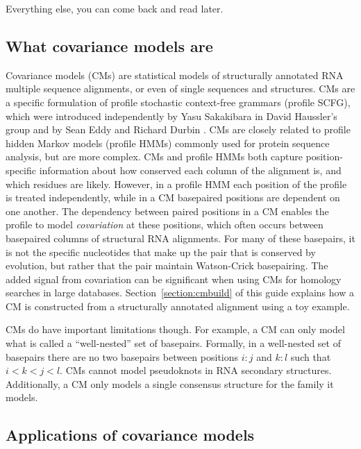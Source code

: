 Everything else, you can come back and read later.

\subsection{What covariance models are}

Covariance models (CMs) are statistical models of structurally
annotated RNA multiple sequence alignments, or even of single
sequences and structures. CMs are a specific formulation of profile
stochastic context-free grammars (profile SCFG), which were introduced
independently by Yasu Sakakibara in David Haussler's
group \citep{Sakakibara94c} and by Sean Eddy and Richard
Durbin \citep{Eddy94}. CMs are closely related to profile hidden Markov
models (profile HMMs) commonly used for protein sequence analysis, but
are more complex. CMs and profile HMMs both capture position-specific
information about how conserved each column of the alignment is, and
which residues are likely. However, in a profile HMM each position of
the profile is treated independently, while in a CM basepaired
positions are dependent on one another.  The dependency between paired
positions in a CM enables the profile to model \emph{covariation} at
these positions, which often occurs between basepaired columns of
structural RNA alignments. For many of these basepairs, it is not the
specific nucleotides that make up the pair that is conserved by
evolution, but rather that the pair maintain Watson-Crick
basepairing. The added signal from covariation can be significant when
using CMs for homology searches in large
databases. Section~\ref{section:cmbuild} of this guide explains how a
CM is constructed from a structurally annotated alignment using a toy
example. 

CMs do have important limitations though. For example, a CM can only
model what is called a ``well-nested'' set of basepairs. Formally, in
a well-nested set of basepairs there are no two basepairs between
positions $i:j$ and $k:l$ such that $i<k<j<l$. CMs cannot model
pseudoknots in RNA secondary structures. Additionally, a CM only
models a single consensus structure for the family it models. 

\subsection{Applications of covariance models}

